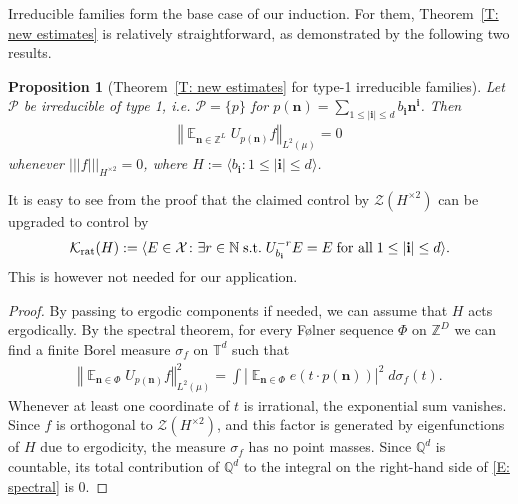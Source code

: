 \documentclass[11pt]{amsart}
\newtheorem{proposition}[lemma]{Proposition}
\theoremstyle{definition}
\DeclareMathOperator*{\E}{\mathbb{E}}
\newcommand{\N}{{\mathbb N}}
\newcommand{\Q}{{\mathbb Q}}
\newcommand{\T}{{\mathbb T}}
\newcommand{\Z}{{\mathbb Z}}
\newcommand{\CK}{{\mathcal K}}
\newcommand{\CP}{{\mathcal P}}
\newcommand{\CX}{{\mathcal X}}
\newcommand{\CZ}{{\mathcal Z}}
\newcommand{\bn}{{\mathbf{n}}}
\newcommand{\norm}[1]{\left\Vert #1\right\Vert}
\newcommand{\nnorm}[1]{\lvert\!|\!| #1|\!|\!\rvert}
\newcommand{\1}{{\mathbf{1}}}
\newcommand{\bi}{{\textbf{i}}}
\newcommand{\Krat}{{\CK_{\text{\rm rat}}}}
\newcommand{\abs}[1]{\mathopen{}\left| #1\mathclose{}\right|}
\begin{document}
Irreducible families form the base case of our induction. For them, Theorem~\ref{T: new estimates} is relatively straightforward, as demonstrated by the following two results.
\begin{proposition}[Theorem~\ref{T: new estimates} for type-1 irreducible families]\label{P: type 1}
    Let $\CP$ be irreducible of type 1, i.e. $\CP = \{p\}$ for $p(\bn) = \sum\limits_{1\leq \vert\bi\vert\leq d} b_{\bi} \bn^\bi$. Then 
    \begin{align*}
        \norm{\E_{\bn\in\Z^{L}}U_{p(\bn)}f}_{L^2(\mu)} = 0
    \end{align*}
    whenever $\nnorm{f}_{H^{\times 2}} = 0$, where $H:=\langle b_\bi\colon 1\leq \vert\bi\vert\leq d\rangle$.
\end{proposition}
It is easy to see from the proof that the claimed control by $\CZ(H^{\times 2})$ can be upgraded to control by
\begin{align*}
    \Krat(H) := \langle E\in\CX\colon \exists r\in\N\; \textrm{s.t.}\; U_{b_\bi}^{-r} E =E\; \textrm{for all}\; 1\leq |\bi|\leq d\rangle.
\end{align*}
This is however not needed for our application. 
\begin{proof}
    By passing to ergodic components if needed, we can assume that $H$ acts ergodically. 
    By the spectral theorem, {for every F{\o}lner sequence $\Phi$ on $\Z^D$}  we can find a finite Borel measure $\sigma_f$ on $\T^d$ such that
    \begin{align}\label{E: spectral}
        \norm{\E_{\bn\in\Phi}U_{p(\bn)}f}_{L^2(\mu)}^2 = \int \abs{\E_{\bn\in\Phi}e(t\cdot p(\bn))}^2\; d\sigma_f(t).
    \end{align}
    Whenever at least one coordinate of $t$ is irrational, the exponential sum vanishes. Since $f$ is orthogonal to $\CZ(H^{\times 2})$, and this factor is generated by eigenfunctions of $H$ due to ergodicity, the measure $\sigma_f$ has no point masses. Since $\Q^d$ is countable, its total contribution of $\Q^d$ to the integral on the right-hand side of \eqref{E: spectral} is 0.
\end{proof}
\end{document}
